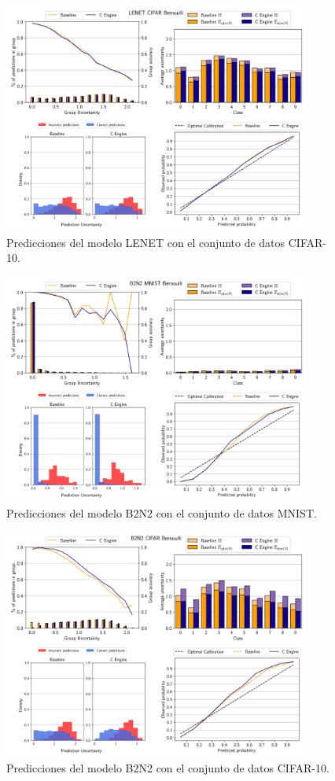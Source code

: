 \begin{figure}[ht]
    \centering
    \includegraphics[width=0.9\textwidth]{root/Imagenes/anexo/Bernoulli-LENET_CIFAR-mosaic.png}
    \caption{Predicciones del modelo LENET con el conjunto de datos CIFAR-10.}
    \label{fig:anx-Bernoulli-LENET_CIFAR}
\end{figure}


\begin{figure}[ht]
    \centering
    \includegraphics[width=0.9\textwidth]{root/Imagenes/anexo/Bernoulli-B2N2_MNIST-mosaic.png}
    \caption{Predicciones del modelo B2N2 con el conjunto de datos MNIST.}
    \label{fig:anx-Bernoulli-B2N2_MNIST}
\end{figure}


\begin{figure}[ht]
    \centering
    \includegraphics[width=0.9\textwidth]{root/Imagenes/anexo/Bernoulli-B2N2_CIFAR-mosaic.png}
    \caption{Predicciones del modelo B2N2 con el conjunto de datos CIFAR-10.}
    \label{fig:anx-Bernoulli-B2N2_CIFAR}
\end{figure}

